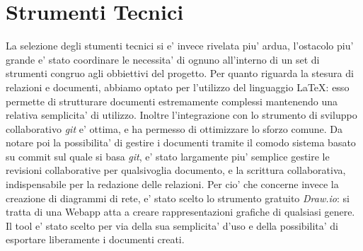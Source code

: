 \documentclass{report}
\begin{document}
        \section{Strumenti Tecnici}
            La selezione degli stumenti tecnici si e' invece rivelata piu' ardua, l'ostacolo piu' grande e' stato coordinare
             le necessita' di ognuno all'interno di un set di strumenti congruo agli obbiettivi del progetto.
            Per quanto riguarda la stesura di relazioni e documenti, abbiamo optato per l'utilizzo del linguaggio \LaTeX:
             esso permette di strutturare documenti estremamente complessi mantenendo una relativa semplicita' di utilizzo.
             Inoltre l'integrazione con lo strumento di sviluppo collaborativo \emph{git} e' ottima, e ha permesso di
             ottimizzare lo sforzo comune. Da notare poi la possibilita' di gestire i documenti tramite il comodo sistema
             basato su commit sul quale si basa \emph{git}, e' stato largamente piu' semplice gestire le revisioni
             collaborative per qualsivoglia documento, e la scrittura collaborativa, indispensabile per la redazione delle
             relazioni.
            Per cio' che concerne invece la creazione di diagrammi di rete, e' stato scelto lo strumento gratuito
             \emph{Draw.io}: si tratta di una Webapp atta a creare rappresentazioni grafiche di qualsiasi genere.
             Il tool e' stato scelto per via della sua semplicita' d'uso e della possibilita' di esportare liberamente
             i documenti creati.
\end{document}
